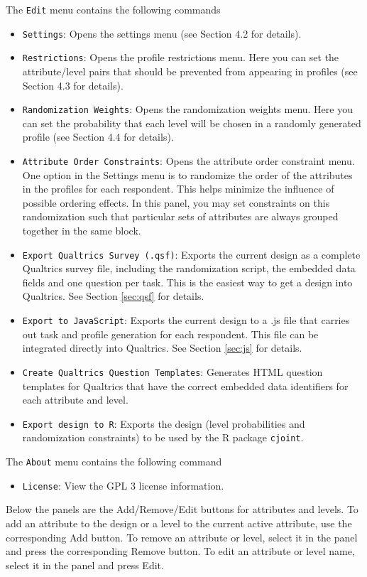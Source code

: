 \documentclass[12pt]{article}
\begin{document}
The \texttt{Edit} menu contains the following commands
\begin{itemize}
\item \texttt{Settings}: Opens the settings menu (see Section 4.2 for details).
\item \texttt{Restrictions}: Opens the profile restrictions menu. Here you can set the attribute/level pairs that should be prevented from appearing in profiles (see Section 4.3 for details).
\item \texttt{Randomization Weights}: Opens the randomization weights menu. Here you can set the probability that each level will be chosen in a randomly generated profile (see Section 4.4 for details).
\item \texttt{Attribute Order Constraints}: Opens the attribute order constraint menu. One option in the Settings menu is to randomize the order of the attributes in the profiles for each respondent. This helps minimize the influence of possible ordering effects. In this panel, you may set constraints on this randomization such that particular sets of attributes are always grouped together in the same block.
\item \texttt{Export Qualtrics Survey (.qsf)}: Exports the current design as a complete Qualtrics survey file, including the randomization script, the embedded data fields and one question per task. This is the easiest way to get a design into Qualtrics. See Section \ref{sec:qsf} for details.
\item \texttt{Export to JavaScript}: Exports the current design to a .js file that carries out task and profile generation for each respondent. This file can be integrated directly into Qualtrics. See Section \ref{sec:js} for details.
\item \texttt{Create Qualtrics Question Templates}: Generates HTML question templates for Qualtrics that have the correct embedded data identifiers for each attribute and level.
\item \texttt{Export design to R}: Exports the design (level probabilities and randomization constraints) to be used by the R package \texttt{cjoint}. 
\end{itemize}

The \texttt{About} menu contains the following command
\begin{itemize}
\item \texttt{License}: View the GPL 3 license information.
\end{itemize}

Below the panels are the Add/Remove/Edit buttons for attributes and levels. To add an attribute to the design or a level to the current active attribute, use the corresponding Add button. To remove an attribute or level, select it in the panel and press the corresponding Remove button. To edit an attribute or level name, select it in the panel and press Edit.
\end{document}
